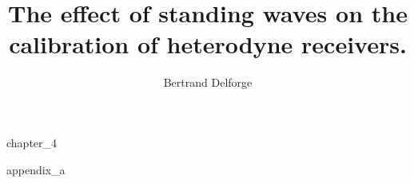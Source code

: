 \documentclass[a4paper,11pt]{book}
\title{The effect of standing waves on the calibration of heterodyne receivers.}
\author{Bertrand Delforge}
\begin{document}
\frontmatter
\maketitle
\tableofcontents

\listoffigures
\listofalgorithms


\mainmatter

{chapter_4}

\begin{appendices}
{appendix_a}
\end{appendices}

\backmatter

%

\cleardoublepage
{}
\printindex

\cleardoublepage
{}
%
\printbibliography
\end{document}
